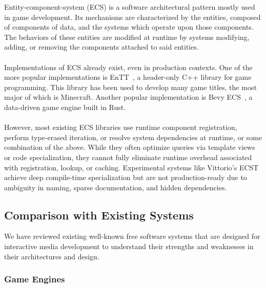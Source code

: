 Entity-component-system (ECS) is a software architectural pattern mostly used in game development.
Its mechanisms are characterized by the entities, composed of components of data,
and the systems which operate upon those components.
The behaviors of these entities are modified at runtime by systems modifying, adding, or removing the components
attached to said entities.
\\\\
Implementations of ECS already exist, even in production contexts.
One of the more popular implementations is EnTT~\cite{ValtoLibraries_EnTT}, a header-only C++ library for game programming.
This library has been used to develop many game titles, the most major of which is Minecraft.
Another popular implementation is Bevy ECS~\cite{Bevy_Engine}, a data-driven game engine built in Rust.
\\\\
However, most existing ECS libraries use runtime component registration, perform type-erased iteration, or resolve
system dependencies at runtime, or some combination of the above.
While they often optimize queries via template views or code specialization, they cannot fully eliminate
runtime overhead associated with registration, lookup, or caching.
Experimental systems like Vittorio's ECST~\cite{vittorio} achieve deep compile-time specialization
but are not production-ready due to ambiguity in naming, sparse documentation, and hidden dependencies.

\subsection{Comparison with Existing Systems}
\label{subsec:comparison-with-existing-systems}

We have reviewed existing well-known free software systems that are designed for interactive media
development to understand their strengths and weaknesses in their architectures and design.

\subsubsection*{Game Engines}

